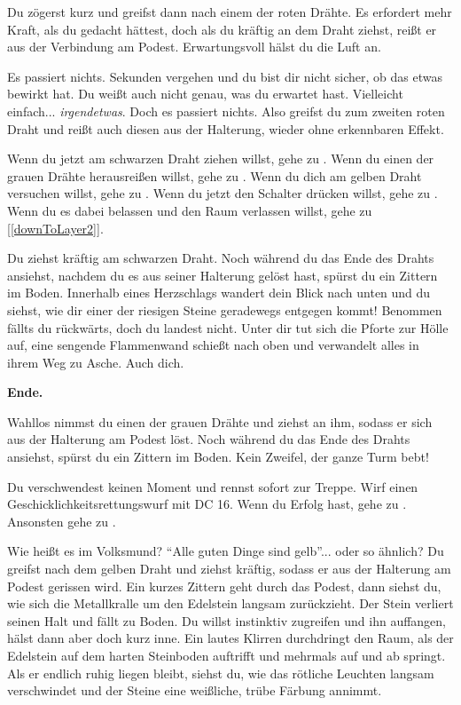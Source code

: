 
Du zögerst kurz und greifst dann nach einem der roten Drähte. Es erfordert mehr Kraft, als du gedacht hättest, doch als du kräftig an dem Draht ziehst, reißt er aus der Verbindung am Podest. Erwartungsvoll hälst du die Luft an.

Es passiert nichts. Sekunden vergehen und du bist dir nicht sicher, ob das etwas bewirkt hat. Du weißt auch nicht genau, was du erwartet hast. Vielleicht einfach... \textit{irgendetwas}. Doch es passiert nichts. Also greifst du zum zweiten roten Draht und reißt auch diesen aus der Halterung, wieder ohne erkennbaren Effekt.

Wenn du jetzt am schwarzen Draht ziehen willst, gehe zu .
Wenn du einen der grauen Drähte herausreißen willst, gehe zu .
Wenn du dich am gelben Draht versuchen willst, gehe zu .
Wenn du jetzt den Schalter drücken willst, gehe zu .
Wenn du es dabei belassen und den Raum verlassen willst, gehe zu [\ref{downToLayer2}].


Du ziehst kräftig am schwarzen Draht. Noch während du das Ende des Drahts ansiehst, nachdem du es aus seiner Halterung gelöst hast, spürst du ein Zittern im Boden. Innerhalb eines Herzschlags wandert dein Blick nach unten und du siehst, wie dir einer der riesigen Steine geradewegs entgegen kommt! Benommen fällts du rückwärts, doch du landest nicht. Unter dir tut sich die Pforte zur Hölle auf, eine sengende Flammenwand schießt nach oben und verwandelt alles in ihrem Weg zu Asche. Auch dich.

\textbf{Ende.}


Wahllos nimmst du einen der grauen Drähte und ziehst an ihm, sodass er sich aus der Halterung am Podest löst. Noch während du das Ende des Drahts ansiehst, spürst du ein Zittern im Boden. Kein Zweifel, der ganze Turm bebt!

Du verschwendest keinen Moment und rennst sofort zur Treppe. Wirf einen Geschicklichkeitsrettungswurf mit DC 16. Wenn du Erfolg hast, gehe zu . Ansonsten gehe zu .


Wie heißt es im Volksmund? ``Alle guten Dinge sind gelb''... oder so ähnlich? Du greifst nach dem gelben Draht und ziehst kräftig, sodass er aus der Halterung am Podest gerissen wird. Ein kurzes Zittern geht durch das Podest, dann siehst du, wie sich die Metallkralle um den Edelstein langsam zurückzieht. Der Stein verliert seinen Halt und fällt zu Boden. Du willst instinktiv zugreifen und ihn auffangen, hälst dann aber doch kurz inne. Ein lautes Klirren durchdringt den Raum, als der Edelstein auf dem harten Steinboden auftrifft und mehrmals auf und ab springt. Als er endlich ruhig liegen bleibt, siehst du, wie das rötliche Leuchten langsam verschwindet und der Steine eine weißliche, trübe Färbung annimmt.

